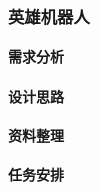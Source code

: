 \subsubsection{英雄机器人}

    \paragraph{需求分析}
    
    \paragraph{设计思路}
    
    \paragraph{资料整理}
    
    \paragraph{任务安排}
    